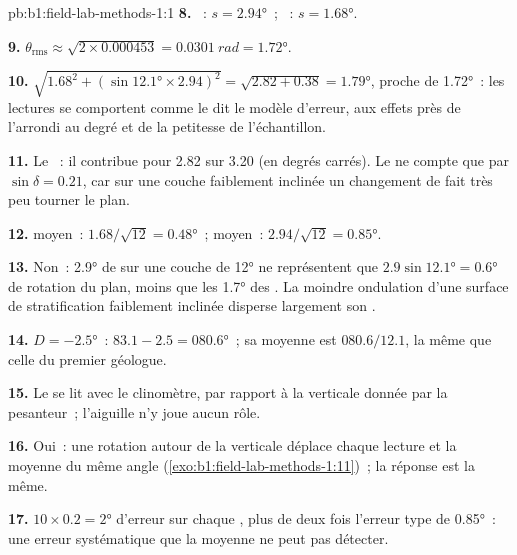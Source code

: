 \begin{solution}{pb:b1:field-lab-methods-1:1}
\textbf{8.} ~: $s = \ang{2.94}$~; ~: $s = \ang{1.68}$.

\textbf{9.} $\theta_{\text{rms}} \approx \sqrt{2\times0.000453} =
\qty{0.0301}{rad} = \ang{1.72}$.

\textbf{10.} $\sqrt{1.68^2 + (\sin\ang{12.1}\times2.94)^2} = \sqrt{2.82 +
0.38} = \ang{1.79}$, proche de \ang{1.72}~: les lectures se comportent comme le
dit le modèle d'erreur, aux effets près de l'arrondi au degré et de la petitesse
de l'échantillon.

\textbf{11.} Le ~: il contribue pour 2.82 sur 3.20 (en degrés carrés). Le
 ne compte que par $\sin\delta = 0.21$, car sur une couche
faiblement inclinée un changement de  fait très peu tourner le
plan.

\textbf{12.}  moyen~: $1.68/\sqrt{12} = \ang{0.48}$~;  moyen~:
$2.94/\sqrt{12} = \ang{0.85}$.

\textbf{13.} Non~: \ang{2.9} de  sur une couche de  \ang{12}
ne représentent que $2.9\sin\ang{12.1} = \ang{0.6}$ de rotation du plan, moins
que les \ang{1.7} des . La moindre ondulation d'une surface de
stratification faiblement inclinée disperse largement son .

\textbf{14.} $D = \ang{-2.5}$~: $83.1 - 2.5 = \ang{080.6}$~; sa moyenne est
$080.6/12.1$, la même que celle du premier géologue.

\textbf{15.} Le  se lit avec le clinomètre, par rapport à la verticale
donnée par la pesanteur~; l'aiguille n'y joue aucun rôle.

\textbf{16.} Oui~: une rotation autour de la verticale déplace chaque lecture et
la moyenne du même angle (\cref{exo:b1:field-lab-methods-1:11})~; la réponse est la même.

\textbf{17.} $10\times0.2 = \ang{2}$ d'erreur sur chaque , plus de
deux fois l'erreur type de \ang{0.85}~: une erreur systématique que la moyenne ne
peut pas détecter.


\end{solution}
